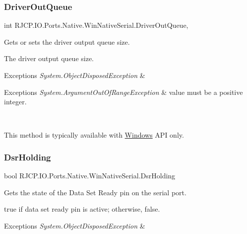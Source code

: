 \subsubsection{\texorpdfstring{DriverOutQueue}{DriverOutQueue}}
{\footnotesize\ttfamily int R\+J\+C\+P.\+I\+O.\+Ports.\+Native.\+Win\+Native\+Serial.\+Driver\+Out\+Queue\hspace{0.3cm}{\ttfamily [get]}, {\ttfamily [set]}}



Gets or sets the driver output queue size. 

The driver output queue size. 


\begin{DoxyExceptions}{Exceptions}
{\em System.\+Object\+Disposed\+Exception} & 
\begin{DoxyExceptions}{Exceptions}
{\em System.\+Argument\+Out\+Of\+Range\+Exception} & value must be a positive integer.\\
\hline
\end{DoxyExceptions}
\\
\hline
\end{DoxyExceptions}
This method is typically available with \mbox{\hyperlink{namespace_r_j_c_p_1_1_i_o_1_1_ports_1_1_native_1_1_windows}{Windows}} A\+PI only. \mbox{\label{class_r_j_c_p_1_1_i_o_1_1_ports_1_1_native_1_1_win_native_serial_a595390049f1a30dc59a4715736919597}} 
\subsubsection{\texorpdfstring{DsrHolding}{DsrHolding}}
{\footnotesize\ttfamily bool R\+J\+C\+P.\+I\+O.\+Ports.\+Native.\+Win\+Native\+Serial.\+Dsr\+Holding\hspace{0.3cm}{\ttfamily [get]}}



Gets the state of the Data Set Ready pin on the serial port. 

{\ttfamily true} if data set ready pin is active; otherwise, {\ttfamily false}. 


\begin{DoxyExceptions}{Exceptions}
{\em System.\+Object\+Disposed\+Exception} & \\
\hline
\end{DoxyExceptions}
\mbox{\label{class_r_j_c_p_1_1_i_o_1_1_ports_1_1_native_1_1_win_native_serial_a4c9fbf48b230bb81917e8157f216786b}} 
